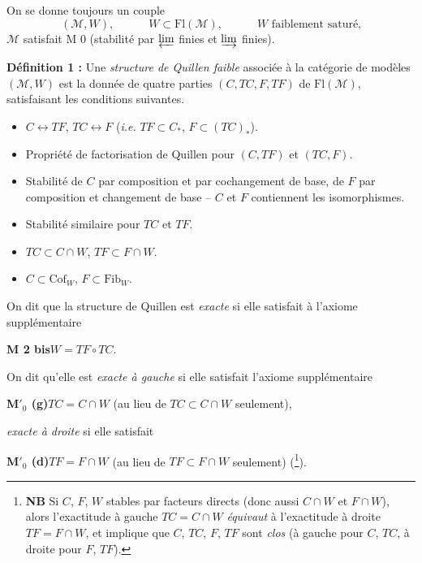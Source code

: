 \documentclass[11pt]{article}
\newcommand{\printedpage}[1]{\marginpar{\footnotesize p.~#1}}
\newcommand{\Cof}{\mathrm{Cof}}
\newcommand{\Fib}{\mathrm{Fib}}
\begin{document}
On se donne toujours un couple
\[
(\mathcal{M}, W), \qquad\quad W \subset \mathrm{Fl}(\mathcal{M}), \qquad\quad W \text{ faiblement saturé,}
\]
$\mathcal{M}$ satisfait M 0 (stabilité par $\varprojlim$ finies et $\varinjlim$ finies).

\noindent\textbf{Définition 1 :} Une \textit{structure de Quillen faible} associée à la catégorie de modèles $(\mathcal{M}, W)$ est la donnée de quatre parties $(C, TC, F, TF)$ de $\mathrm{Fl}(\mathcal{M})$, satisfaisant les conditions suivantes.

\begin{itemize}[leftmargin=3em,labelsep=0.5em,align=left]
\item[\textbf{M 1}] $C \longleftrightarrow TF$, $TC \longleftrightarrow F$ (\textit{i.e.} $TF \subset C_*$, $F \subset (TC)_*$).
\item[\textbf{M 2}] Propriété de factorisation de Quillen pour $(C, TF)$ et $(TC, F)$.
\item[\textbf{M 3}] Stabilité de $C$ par composition et par cochangement de base, de $F$ par composition et changement de base -- $C$ et $F$ contiennent les isomorphismes.
\item[\textbf{M 4}] Stabilité similaire pour $TC$ et $TF$.
\item[$\mathbf{M}'$] $TC \subset C \cap W$, $TF \subset F \cap W$.
\item[$\mathbf{M}''$] $C \subset \Cof_W$, $F \subset \Fib_W$.
\end{itemize}

\noindent On dit que la structure de Quillen est \textit{exacte} si elle satisfait à l'axiome supplémentaire

\clearpage
\printedpage{17}

\noindent\textbf{M 2 bis}\qquad $W = TF \circ TC$.

\noindent On dit qu'elle est \textit{exacte à gauche} si elle satisfait l'axiome supplémentaire

\noindent\textbf{M$'_0$ (g)}\qquad $TC = C \cap W$ (au lieu de $TC \subset C \cap W$ seulement),

\noindent\textit{exacte à droite} si elle satisfait

\noindent\textbf{M$'_0$ (d)}\qquad $TF = F \cap W$ (au lieu de $TF \subset F \cap W$ seulement) (\footnote[20]{\textbf{NB} Si $C$, $F$, $W$ stables par facteurs directs (donc aussi $C \cap W$ et $F \cap W$), alors l'exactitude à gauche $TC = C \cap W$ \textit{équivaut} à l'exactitude à droite $TF = F \cap W$, et implique que $C$, $TC$, $F$, $TF$ sont \textit{clos} (à gauche pour $C$, $TC$, à droite pour $F$, $TF$).}).
\end{document}

